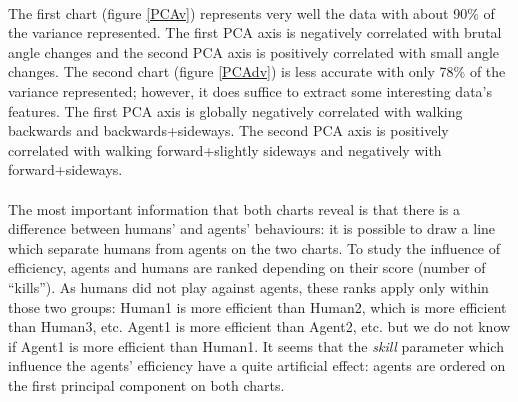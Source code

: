 \documentclass[a4paper,twocolumn]{article}
\begin{document}
\paragraph{}%
The first chart (figure \ref{PCAv}) represents very well the data with about 90\% of the variance represented. The first PCA axis is negatively correlated with brutal angle changes and the second PCA axis is positively correlated with small angle changes. The second chart (figure \ref{PCAdv}) is less accurate with only 78\% of the variance represented; however, it does suffice to extract some interesting data's features. The first PCA axis is globally negatively correlated with walking backwards and backwards+sideways. The second PCA axis is positively correlated with walking forward+slightly sideways and negatively with forward+sideways.
\paragraph{}
The most important information that both charts reveal is that there is a difference between humans' and agents' behaviours: it is possible to draw a line which separate humans from agents on the two charts. To study the influence of efficiency, agents and humans are ranked depending on their score (number of ``kills''). As humans did not play against agents, these ranks apply only within those two groups: Human1 is more efficient than Human2, which is more efficient than Human3, etc. Agent1 is more efficient than Agent2, etc. but we do not know if Agent1 is more efficient than Human1. It seems that the \emph{skill} parameter which influence the agents' efficiency have a quite artificial effect: agents are ordered on the first principal component on both charts.
\end{document}
